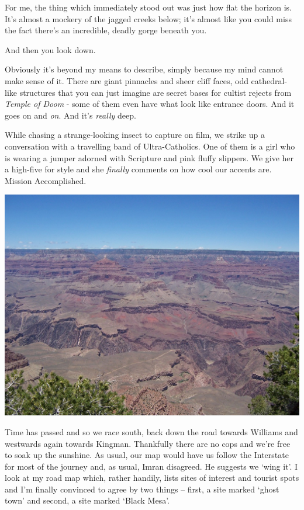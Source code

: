 \documentclass[a5paper,titlepage,11pt]{book}
\begin{document}
For me, the thing which immediately stood out was just how flat the horizon is.  It's almost a mockery of the jagged creeks below; it's almost like you could miss the fact there's an incredible, deadly gorge beneath you.

And then you look down.

Obviously it's beyond my means to describe, simply because my mind cannot make sense of it.  There are giant pinnacles and sheer cliff faces, odd cathedral-like structures that you can just imagine are secret bases for cultist rejects from \emph{Temple of Doom} - some of them even have what look like entrance doors.  And it goes on and \emph{on}.  And it's \emph{really} deep.

While chasing a strange-looking insect to capture on film, we strike up a conversation with a travelling band of Ultra-Catholics.  One of them is a girl who is wearing a jumper adorned with Scripture and pink fluffy slippers.  We give her a high-five for style and she \emph{finally} comments on how cool our accents are.  Mission Accomplished.

\begin{center}\includegraphics[width=\textwidth]{gfx/100_1458}\end{center}

Time has passed and so we race south, back down the road towards Williams and westwards again towards Kingman.  Thankfully there are no cops and we're free to soak up the sunshine.  As usual, our map would have us follow the Interstate for most of the journey and, as usual, Imran disagreed.  He suggests we `wing it'.  I look at my road map which, rather handily, lists sites of interest and tourist spots and I'm finally convinced to agree by two things -- first, a site marked `ghost town' and second, a site marked `Black Mesa'.
\end{document}
